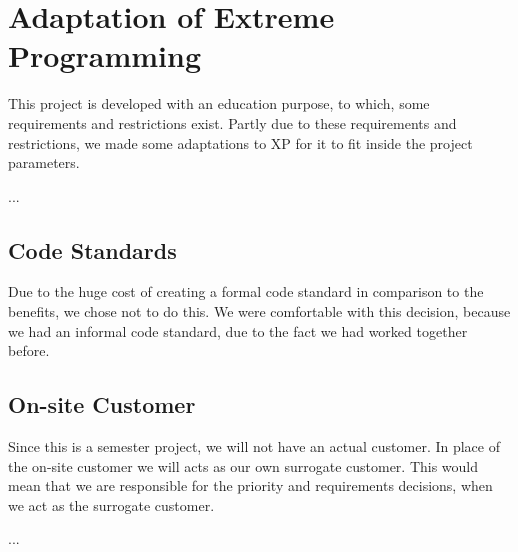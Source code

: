 \section{Adaptation of Extreme Programming}
This project is developed with an education purpose, to which, some requirements and restrictions exist.
Partly due to these requirements and restrictions, we made some adaptations to XP for it to fit inside the project parameters.

...

\subsection{Code Standards}
Due to the huge cost of creating a formal code standard in comparison to the benefits, we chose not to do this.
We were comfortable with this decision, because we had an informal code standard, due to the fact we had worked together before.


\subsection{On-site Customer}
Since this is a semester project, we will not have an actual customer.
In place of the on-site customer we will acts as our own surrogate customer.
This would mean that we are responsible for the priority and requirements decisions, when we act as the surrogate customer.

...


